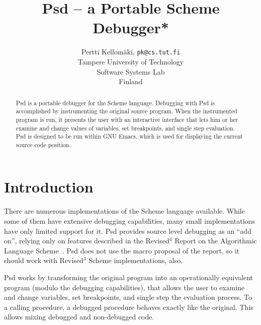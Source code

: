 %
%
%
%
%

\makeatletter
\long{}
\makeatother

\epsfverbosetrue

\newcommand{\scheme}[1]{{\tt #1}}
\newcommand{\foot}[2]{#1\footnotetext{\hbox to 1em{#1\hss}#2}}
\author{Pertti Kellom\"aki, {\tt pk@cs.tut.fi}\\ 
Tampere University of Technology \\
Software Systems Lab \\
Finland}
\title{Psd -- a Portable Scheme Debugger\foot{*}{To appear in Lisp Pointers}}
\maketitle
\pagestyle{empty}
\thispagestyle{empty}

\begin{abstract}
Psd is a portable debugger for the Scheme language. Debugging with Psd
is accomplished by instrumenting the original source program. When the
instrumented program is run, it presents the user with an interactive
interface that lets him or her examine and change values of variables,
set breakpoints, and single step evaluation. Psd is designed to be run
within GNU Emacs, which is used for displaying the current source code
position.
\end{abstract}

\section{Introduction}

There are numerous implementations of the Scheme language available.
While some of them have extensive debugging capabilities, many small
implementations have only limited support for it. Psd provides source
level debugging as an ``add on'', relying only on features described
in the Revised${}^4$ Report on the Algorithmic Language
Scheme~\cite{r4rs}. Psd does not use the macro proposal of the report,
so it should work with Revised${}^3$ Scheme implementations, also.

Psd works by transforming the original program into an operationally
equivalent program (modulo the debugging capabilities), that allows the
user to examine and change variables, set breakpoints, and single step
the evaluation process. To a calling procedure, a debugged procedure
behaves exactly like the original. This allows mixing debugged and
non-debugged code.

